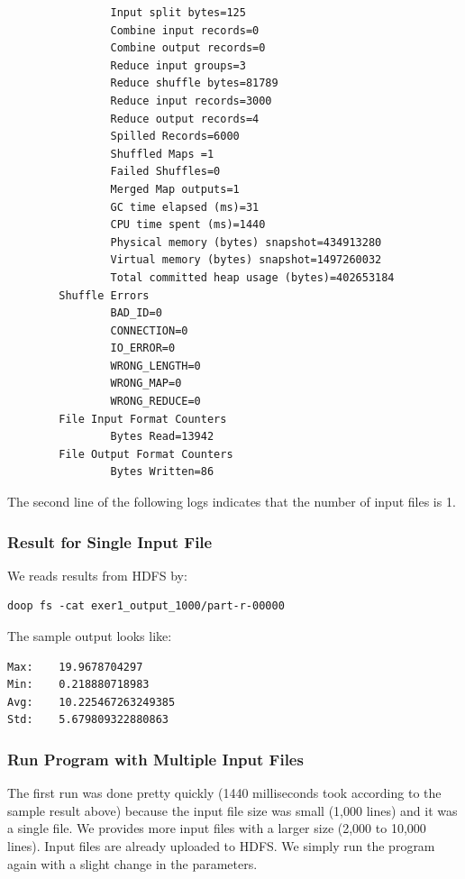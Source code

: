 \begin{lstlisting}
                Input split bytes=125
                Combine input records=0
                Combine output records=0
                Reduce input groups=3
                Reduce shuffle bytes=81789
                Reduce input records=3000
                Reduce output records=4
                Spilled Records=6000
                Shuffled Maps =1
                Failed Shuffles=0
                Merged Map outputs=1
                GC time elapsed (ms)=31
                CPU time spent (ms)=1440
                Physical memory (bytes) snapshot=434913280
                Virtual memory (bytes) snapshot=1497260032
                Total committed heap usage (bytes)=402653184
        Shuffle Errors
                BAD_ID=0
                CONNECTION=0
                IO_ERROR=0
                WRONG_LENGTH=0
                WRONG_MAP=0
                WRONG_REDUCE=0
        File Input Format Counters
                Bytes Read=13942
        File Output Format Counters
                Bytes Written=86

\end{lstlisting}

The second line of the following logs indicates that the number of
input files is 1.

\subsubsection{Result for Single Input File}

We reads results from HDFS by:

\begin{lstlisting}
doop fs -cat exer1_output_1000/part-r-00000
\end{lstlisting}

The sample output looks like:

\begin{lstlisting}
Max:    19.9678704297
Min:    0.218880718983
Avg:    10.225467263249385
Std:    5.679809322880863
\end{lstlisting}

\subsubsection{Run Program with Multiple Input Files}

The first run was done pretty quickly (1440 milliseconds took
according to the sample result above) because the input file size was
small (1,000 lines) and it was a single file. We provides more input
files with a larger size (2,000 to 10,000 lines). Input files are
already uploaded to HDFS. We simply run the program again with a
slight change in the parameters.

